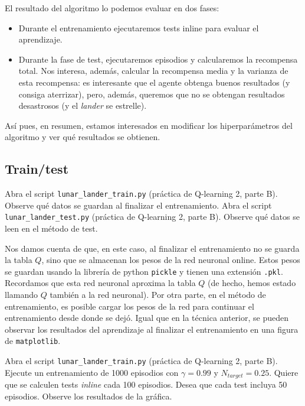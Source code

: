 \documentclass{article}
\begin{document}
El resultado del algoritmo lo podemos evaluar en dos fases:
\begin{itemize}
    \item Durante el entrenamiento ejecutaremos tests inline para evaluar el aprendizaje. 
    \item Durante la fase de test, ejecutaremos episodios y calcularemos la recompensa total. Nos interesa, además, calcular la recompensa media y la varianza de esta recompensa: es interesante que el agente obtenga buenos resultados (y consiga aterrizar), pero, además, queremos que no se obtengan resultados desastrosos (y el \textit{lander} se estrelle).
\end{itemize}

Así pues, en resumen, estamos interesados en modificar los hiperparámetros del algoritmo y ver qué resultados se obtienen.

\subsection{Train/test}

\begin{exercise}
    Abra el script \texttt{lunar\_lander\_train.py} (práctica de Q-learning 2, parte B). Observe qué datos se guardan al finalizar el entrenamiento.
    Abra el script \texttt{lunar\_lander\_test.py} (práctica de Q-learning 2, parte B). Observe qué datos se leen en el método de test.
\end{exercise}

Nos damos cuenta de que, en este caso, al finalizar el entrenamiento no se guarda la tabla $Q$, sino que se almacenan los pesos de la red neuronal online. Estos pesos se guardan usando la librería de python \texttt{pickle} y tienen una extensión \texttt{.pkl}. Recordamos que esta red neuronal aproxima la tabla $Q$ (de hecho, hemos estado llamando $Q$ también a la red neuronal). Por otra parte, en el método de entrenamiento, es posible cargar los pesos de la red para continuar el entrenamiento desde donde se dejó. Igual que en la técnica anterior, se pueden observar los resultados del aprendizaje al finalizar el entrenamiento en una figura de \texttt{matplotlib}. 


\begin{exercise}
    Abra el script \texttt{lunar\_lander\_train.py} (práctica de Q-learning 2, parte B). Ejecute un entrenamiento de 1000 episodios con $\gamma=0.99$ y $N_{target}=0.25$. Quiere que se calculen tests \textit{inline} cada 100 episodios. Desea que cada test incluya 50 episodios. Observe los resultados de la gráfica.
\end{exercise}
\end{document}
